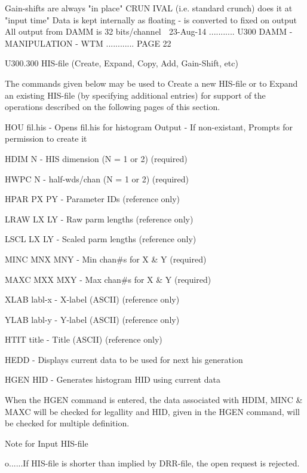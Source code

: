    Gain-shifts are always "in place"
   CRUN IVAL (i.e. standard crunch) does it at "input time"
   Data is kept internally as floating - is converted to fixed on output
   All output from DAMM is 32 bits/channel
    
   23-Aug-14 ........... U300  DAMM - MANIPULATION - WTM ............ PAGE  22
 
 
   U300.300  HIS-file (Create, Expand, Copy, Add, Gain-Shift, etc)
 
   The commands given below may be used to Create a new HIS-file or to  Expand
   an  existing HIS-file (by specifying additional entries) for support of the
   operations described on the following pages of this section.
 
   HOU  fil.his     - Opens fil.his for histogram Output
                    - If non-existant, Prompts for permission to create it
 
   HDIM N           - HIS dimension (N = 1 or 2) (required)
 
   HWPC N           - half-wds/chan (N = 1 or 2) (required)
 
   HPAR PX PY       - Parameter IDs              (reference only)
 
   LRAW LX LY       - Raw    parm lengths        (reference only)
 
   LSCL LX LY       - Scaled parm lengths        (reference only)
 
   MINC MNX MNY     - Min chan#s for X & Y       (required)
 
   MAXC MXX MXY     - Max chan#s for X & Y       (required)
 
   XLAB labl-x      - X-label (ASCII)            (reference only)
 
   YLAB labl-y      - Y-label (ASCII)            (reference only)
 
   HTIT title       - Title   (ASCII)            (reference only)
 
   HEDD             - Displays current data to be used for next his generation
 
   HGEN HID         - Generates histogram HID using current data
 
 
   When the HGEN command is entered, the data associated  with  HDIM,  MINC  &
   MAXC  will  be  checked  for  legallity and HID, given in the HGEN command,
   will be checked for multiple definition.
 
   Note for Input HIS-file
 
   o......If HIS-file is shorter than implied by DRR-file,  the  open  request
          is rejected.
 
